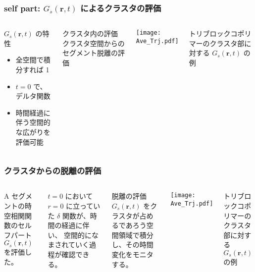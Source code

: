 \documentclass[12pt, dvipdfmx]{beamer}
\begin{document}
\begin{frame}
\frametitle{self part: $G_s(\bm{r}, t)$ によるクラスタの評価}

\begin{columns}[T, totalwidth=0.96\linewidth]

\begin{block}{$G_s(\bm{r}, t)$ の特性}
	\begin{itemize}
	\item
	全空間で積分すれば 1\\
	\item
	$t=0$ で、デルタ関数
	\item
	時間経過に伴う空間的な広がりを評価可能
	\end{itemize}
\end{block}

\begin{alertblock}{クラスタ内の評価}
クラスタ空間からのセグメント脱離の評価
\end{alertblock}

\texttt{[image: Ave\_Trj.pdf]}

\centering
トリブロックコポリマーのクラスタ部に対する $G_s(\bm{r}, t)$ の例
\end{columns}
\end{frame}



\begin{frame}

\frametitle{クラスタからの脱離の評価}

\begin{columns}[T, totalwidth=\linewidth]
A セグメントの時空相関関数のセルフパート $G_s(\bm{r}, t)$ を評価した。

$t=0$ において $r=0$ に立っていた $\delta$ 関数が、時間の経過に伴い、{\color{red} 空間的になまされていく過程}が確認できる。

\begin{exampleblock}{脱離の評価}
$G_s(\bm{r}, t)$ をクラスタが占めるであろう空間領域で積分し、その時間変化をモニタする。
\end{exampleblock}


	\texttt{[image: Ave\_Trj.pdf]}

    \centering
    トリブロックコポリマーのクラスタ部に対する $G_s(\bm{r}, t)$ の例
\end{columns}

\end{frame}
\end{document}
